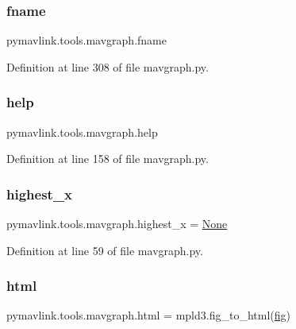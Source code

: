 \subsubsection{\texorpdfstring{fname}{fname}}
{\footnotesize\ttfamily pymavlink.\+tools.\+mavgraph.\+fname}



Definition at line 308 of file mavgraph.\+py.

\mbox{\label{namespacepymavlink_1_1tools_1_1mavgraph_a2803f5f3d58334e8a302d3a994334ca9}} 
\subsubsection{\texorpdfstring{help}{help}}
{\footnotesize\ttfamily pymavlink.\+tools.\+mavgraph.\+help}



Definition at line 158 of file mavgraph.\+py.

\mbox{\label{namespacepymavlink_1_1tools_1_1mavgraph_acdf25cf5ff7a6fe89275cc858098e27d}} 
\subsubsection{\texorpdfstring{highest\_x}{highest\_x}}
{\footnotesize\ttfamily pymavlink.\+tools.\+mavgraph.\+highest\+\_\+x = \mbox{\hyperlink{namespacepymavlink_1_1tools_1_1mavgraph_ac228c9fead001187c8aeb74f0302fb9a}{None}}}



Definition at line 59 of file mavgraph.\+py.

\mbox{\label{namespacepymavlink_1_1tools_1_1mavgraph_a0177eb20ccaa0775cf9fe35f8733252e}} 
\subsubsection{\texorpdfstring{html}{html}}
{\footnotesize\ttfamily pymavlink.\+tools.\+mavgraph.\+html = mpld3.\+fig\+\_\+to\+\_\+html(\mbox{\hyperlink{namespacepymavlink_1_1tools_1_1mavgraph_ac18c2a234fcdd0957038c08ead266890}{fig}})}



